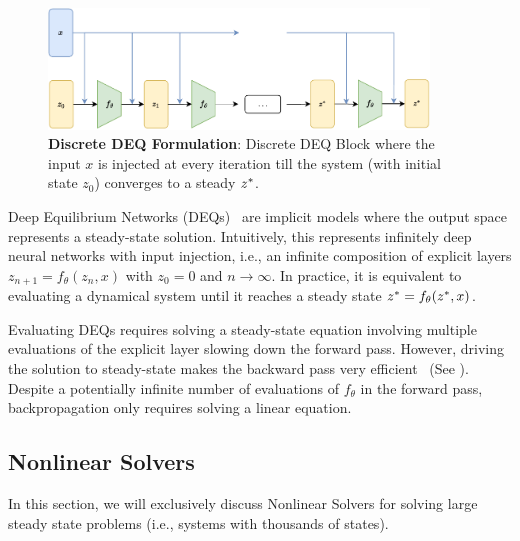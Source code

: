 \begin{figure}[t]
  \centering
  \includegraphics[width=0.9\textwidth]{../figures/deep_equilibrium_models/model_architecture.pdf}
  \caption{\textbf{Discrete DEQ Formulation}: Discrete DEQ Block where the input $x$ is injected at every iteration till the system (with initial state $z_0$) converges to a steady $z^*$.}
  \label{fig:model_architecture_discrete_deq}
\end{figure}

Deep Equilibrium Networks (DEQs)~\citep{bai_deep_2019} are implicit models where the output space represents a steady-state solution. Intuitively, this represents infinitely deep neural networks with input injection, i.e., an infinite composition of explicit layers $z_{n + 1} = f_\theta(z_n, x)$ with $z_0 = 0$ and $n \rightarrow \infty$. In practice, it is equivalent to evaluating a dynamical system until it reaches a steady state $z^* = f_\theta(z^*, x)$.


Evaluating DEQs requires solving a steady-state equation involving multiple evaluations of the explicit layer slowing down the forward pass. However, driving the solution to steady-state makes the backward pass very efficient~\citep{johnson2012notes} (See ). Despite a potentially infinite number of evaluations of $f_\theta$ in the forward pass, backpropagation only requires solving a linear equation.

\subsection{Nonlinear Solvers}
\label{subsec:nonlinear_solvers_deqs}

In this section, we will exclusively discuss Nonlinear Solvers for solving large steady state problems (i.e., systems with thousands of states).

